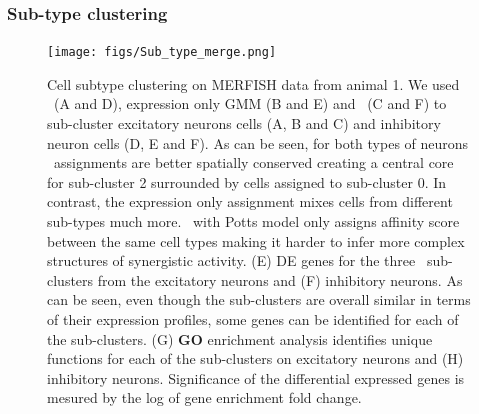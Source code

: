 \subsubsection{Sub-type clustering}
\begin{figure}[hbt!]
    \centering
    \texttt{[image: figs/Sub\_type\_merge.png]}
    \caption{Cell subtype clustering on MERFISH data from animal 1. We used \smfish\ (A and D), expression only GMM (B and E) and \fict\ (C and F) to sub-cluster excitatory neurons cells (A, B and C) and inhibitory neuron cells (D, E and F). As can be seen, for both types of neurons \fict\ assignments are better spatially conserved creating a central core for sub-cluster 2 surrounded by cells assigned to sub-cluster 0. In contrast, the expression only assignment mixes cells from different sub-types much more. \smfish\ with Potts model only assigns affinity score between the same cell types making it harder to infer more complex structures of synergistic activity. (E) DE genes for the three \fict\ sub-clusters from the excitatory neurons and (F) inhibitory neurons. As can be seen, even though the sub-clusters are overall similar in terms of their expression profiles, some genes can be identified for each of the sub-clusters. (G) \textbf{GO} enrichment analysis identifies unique functions for each of the sub-clusters on excitatory neurons and (H) inhibitory neurons. Significance of the differential expressed genes is mesured by the log of gene enrichment fold change.}
    \label{fig:Subtype}
\end{figure}
